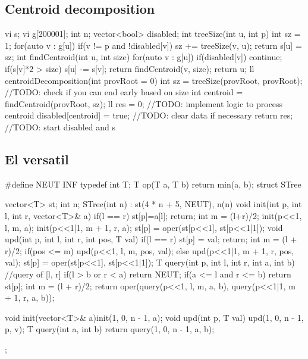 \documentclass[10pt, landscape, twocolumn, a4paper, notitlepage]{article}
\begin{document}
\subsection{Centroid decomposition}
\begin{code}
vi s;
vi g[200001];
int n;
vector<bool> disabled;
int treeSize(int u, int p) {
    int sz = 1;
    for(auto v : g[u]) {
        if(v != p and !disabled[v]) {
            sz += treeSize(v, u);
        }
    }
    return s[u] = sz;
} 
int findCentroid(int u, int size) {
    for(auto v : g[u]) {
        if(disabled[v]) continue;
        if(s[v]*2 > size) {
            s[u] -= s[v];  
            return findCentroid(v, size);
        }
    }
    return u;
}
ll centroidDecomposition(int provRoot = 0) {
    int sz = treeSize(provRoot, provRoot);
    //TODO: check if you can end early based on size
    int centroid = findCentroid(provRoot, sz);
    ll res = 0;
    //TODO: implement logic to process centroid
    disabled[centroid] = true;
    //TODO: clear data if necessary
    return res;
}
//TODO: start disabled and s
\end{code}

\subsection{El versatil}
\begin{code}
#define NEUT INF
typedef int T;
T op(T a, T b) {return min(a, b);}
struct STree {
    vector<T> st; int n;
    STree(int n) : st(4 * n + 5, NEUT), n(n) {}
    void init(int p, int l, int r, vector<T>& a) {
        if(l == r) {st[p]=a[l]; return;}
        int m = (l+r)/2;
        init(p<<1, l, m, a); init(p<<1|1, m + 1, r, a);
        st[p] = oper(st[p<<1], st[p<<1|1]);
    }
    void upd(int p, int l, int r, int pos, T val) {
        if(l == r) {st[p] = val; return;}
        int m = (l + r)/2;
        if(pos <= m) upd(p<<1, l, m, pos, val);
        else upd(p<<1|1, m + 1, r, pos, val);
        st[p] = oper(st[p<<1], st[p<<1|1]);
    }
    T query(int p, int l, int r, int a, int b) { //query of [l, r]
        if(l > b or r < a) return NEUT;
        if(a <= l and r <= b) return st[p];
        int m = (l + r)/2;
        return oper(query(p<<1, l, m, a, b), query(p<<1|1, m + 1, r, a, b));
    }

    void init(vector<T>& a){init(1, 0, n - 1, a);}
    void upd(int p, T val) {upd(1, 0, n - 1, p, v);}
    T query(int a, int b) {return query(1, 0, n - 1, a, b);}
};
\end{code}
\end{document}
